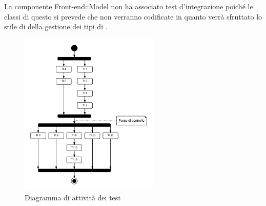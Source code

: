 	La componente Front-end::Model non ha associato test d'integrazione poiché le classi di questo  si prevede che non verranno codificate in quanto verrà sfruttato lo stile di  della gestione dei tipi di .

	\begin{figure}[H]
	\centering \includegraphics[width=0.59\textwidth]{sequenza-dei-test.png}
	\caption{Diagramma di attività dei test}
	\label{fig:sequenza-dei-test}
	\end{figure}
	
